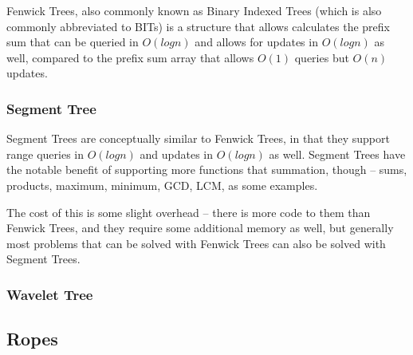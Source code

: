 Fenwick Trees, also commonly known as Binary Indexed Trees (which is also commonly abbreviated to BITs) is a structure that allows calculates the prefix sum that can be queried in $O(log n)$ and allows for updates in $O(log n)$ as well, compared to the prefix sum array that allows $O(1)$ queries but $O(n)$ updates.

\subsubsection{Segment Tree}

Segment Trees are conceptually similar to Fenwick Trees, in that they support range queries in $O(log n)$ and updates in $O(log n)$ as well. Segment Trees have the notable benefit of supporting more functions that summation, though -- sums, products, maximum, minimum, GCD, LCM, as some examples.

The cost of this is some slight overhead -- there is more code to them than Fenwick Trees, and they require some additional memory as well, but generally most problems that can be solved with Fenwick Trees can also be solved with Segment Trees.

\subsubsection{Wavelet Tree}
\subsection{Ropes}

